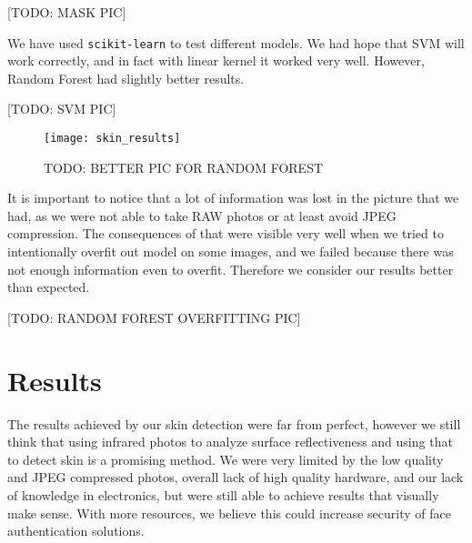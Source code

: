                 [TODO: MASK PIC]

                We have used \texttt{scikit-learn} to test different models.
                We had hope that SVM will work correctly,
                and in fact with linear kernel it worked very well.
                However, Random Forest had slightly better results.

                [TODO: SVM PIC]

                \begin{figure}[H]
                    \caption{TODO: BETTER PIC FOR RANDOM FOREST}
                    \centering
                    \texttt{[image: skin\_results]}
                    \label{fig:skin_results}
                \end{figure}

                It is important to notice that a lot of information was lost in the
                picture that we had, as we were not able to take RAW photos or at least
                avoid JPEG compression.
                The consequences of that were visible very well when we tried to
                intentionally overfit out model on some images, and we failed
                because there was not enough information even to overfit.
                Therefore we consider our results better than expected.

                [TODO: RANDOM FOREST OVERFITTING PIC]

    \section{Results}
        The results achieved by our skin detection were far from perfect,
        however we still think that using infrared photos to analyze surface
        reflectiveness and using that to detect skin is a promising method.
        We were very limited by the low quality and JPEG compressed photos,
        overall lack of high quality hardware, and our lack of knowledge in electronics,
        but were still able to achieve results that visually make sense.
        With more resources, we believe this could increase security of
        face authentication solutions.

